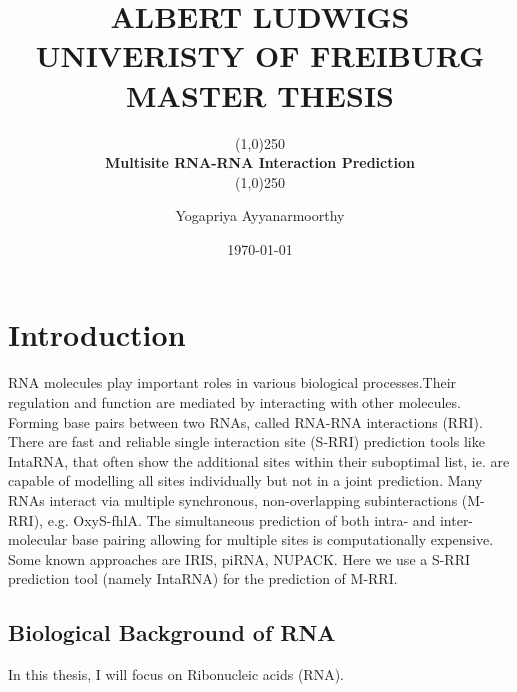 \documentclass[twoside,a4paper]{report}
\title{ALBERT LUDWIGS UNIVERISTY OF FREIBURG
\\{\Large MASTER THESIS}}
\subtitle{\line(1,0){250}\\\textbf{\Huge Multisite RNA-RNA Interaction Prediction}\\\line(1,0){250}}
\author{Yogapriya Ayyanarmoorthy}
\date{\today}
\begin{document}
	
	\maketitle
	
	\tableofcontents
	
	\chapter{Introduction}
	RNA molecules play important roles in various biological processes.Their regulation and function are mediated by interacting with other molecules. 	Forming base pairs between two RNAs, called RNA-RNA interactions (RRI). There are fast and reliable single interaction site (S-RRI) prediction tools like IntaRNA, that often show the additional sites within their suboptimal list, ie. are capable of modelling all sites individually but not in a joint prediction. Many RNAs interact via multiple synchronous, non-overlapping subinteractions (M-RRI), e.g. OxyS-fhlA. The simultaneous prediction of both intra- and inter-molecular base pairing allowing for multiple sites is computationally expensive. Some known approaches are IRIS, piRNA, NUPACK. Here we use a S-RRI prediction tool (namely IntaRNA) for the prediction of M-RRI.
	
	\section{Biological Background of RNA}
	In this thesis, I will focus on Ribonucleic acids (RNA).\\
	
\end{document}

